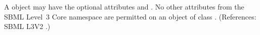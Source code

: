 A \ListOfModifierSpeciesReferences object may have the optional attributes
  and .  No other attributes from the SBML
Level~3 Core namespace are permitted on an object of class
\ListOfModifierSpeciesReferences.  (References: SBML L3V2
.)

